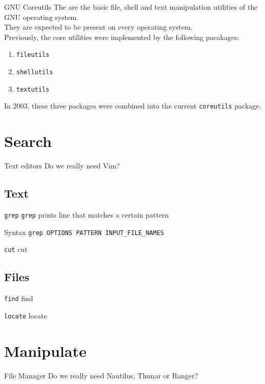 \documentclass[11pt]{beamer}
\begin{document}
		\begin{frame}{GNU Coreutils}
				The {\color{blue}{GNU Core Utilities}} are the basic file, shell and text manipulation utilities of the GNU operating system. \\
				They are expected to be present on every operating system. \\
				Previously, the core utilities were implemented by the following pacakages:
				\begin{enumerate}
				  \item \texttt{fileutils} 
				  \item \texttt{shellutils} 
				  \item \texttt{textutils}
				\end{enumerate}	
				In 2003, these three packages were combined into the current \texttt{coreutils} package.
		\end{frame}
	
	\section{Search}
		\begin{frame}{Text editors}
			Do we really need Vim?	
		\end{frame}
		\subsection{Text}
			\begin{frame}{\texttt{grep}}
					\texttt{grep} prints line that matches a certain pattern
						\begin{exampleblock}{Syntax}
							\texttt{grep OPTIONS PATTERN INPUT\_FILE\_NAMES}
						\end{exampleblock}
			\end{frame}
			\begin{frame}{\texttt{cut}}
				cut
			\end{frame}
		\subsection{Files}
			\begin{frame}{ \texttt{find}}
				find
			\end{frame}
			\begin{frame}{ \texttt{locate}}
				locate
			\end{frame}
	
	\section{Manipulate}
		\begin{frame}{File Manager}
			Do we really need Nautilus, Thunar or Ranger?	
		\end{frame}
\end{document}
